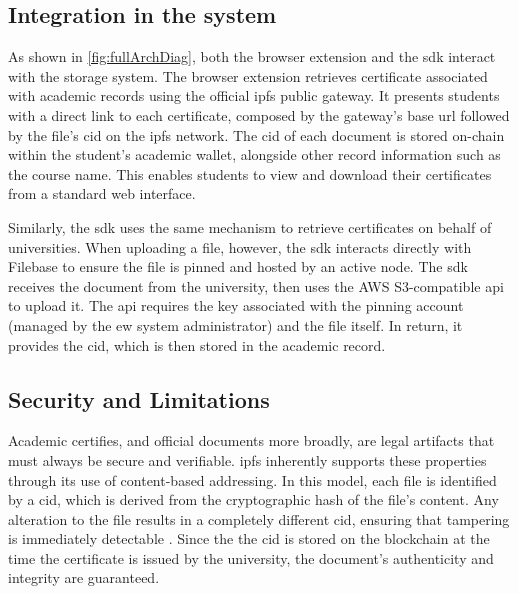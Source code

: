 \subsection{Integration in the system}
As shown in \cref{fig:fullArchDiag}, both the browser extension and the \acrshort{sdk} interact with the storage system. The browser extension retrieves certificate associated with academic records using the official \acrshort{ipfs} public gateway. It presents students with a direct link to each certificate, composed by the gateway's base \acrshort{url} followed by the file's \acrfull{cid} on the \acrshort{ipfs} network. The \acrshort{cid} of each document is stored on-chain within the student's academic wallet, alongside other record information such as the course name. This enables students to view and download their certificates from a standard web interface.

Similarly, the \acrshort{sdk} uses the same mechanism to retrieve certificates on behalf of universities. When uploading a file, however, the \acrshort{sdk} interacts directly with Filebase to ensure the file is pinned and hosted by an active node. The \acrshort{sdk} receives the document from the university, then uses the AWS S3-compatible \acrshort{api} to upload it. The \acrshort{api} requires the key associated with the pinning account (managed by the \acrshort{ew} system administrator) and the file itself. In return, it provides the \acrshort{cid}, which is then stored in the academic record.

\subsection{Security and Limitations}
Academic certifies, and official documents more broadly, are legal artifacts that must always be secure and verifiable. \acrshort{ipfs} inherently supports these properties through its use of content-based addressing. In this model, each file is identified by a \acrshort{cid}, which is derived from the cryptographic hash of the file's content. Any alteration to the file results in a completely different \acrshort{cid}, ensuring that tampering is immediately detectable \cite{benet2014ipfscontentaddressed}. Since the the \acrshort{cid} is stored on the blockchain at the time the certificate is issued by the university, the document's authenticity and integrity are guaranteed.

